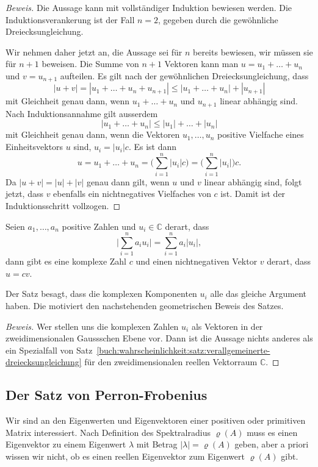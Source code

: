 \begin{proof}[Beweis]
Die Aussage kann mit vollständiger Induktion bewiesen werden.
Die Induktionsverankerung ist der Fall $n=2$, gegeben durch die
gewöhnliche Dreiecksungleichung.

Wir nehmen daher jetzt an, die Aussage sei für $n$ bereits bewiesen,
wir müssen sie für $n+1$ beweisen.
Die Summe von $n+1$ Vektoren kann man $u=u_1+\dots+u_n$ und $v=u_{n+1}$
aufteilen.
Es gilt nach der gewöhnlichen Dreiecksungleichung, dass
\[
|u+v|
=
|u_1+\dots+u_n+u_{n+1}|
\le
|u_1+\dots+u_n|+|u_{n+1}|
\]
mit Gleichheit genau dann, wenn $u_1+\dots+u_n$ und $u_{n+1}$
linear abhängig sind.
Nach Induktionsannahme gilt ausserdem
\[
|u_1+\dots+u_n| \le |u_1|+\dots+|u_n|
\]
mit Gleichheit genau dann, wenn die Vektoren $u_1,\dots,u_n$
positive Vielfache eines Einheitsvektors $u$ sind, $u_i=|u_i|c$.
Es ist dann
\[
u=u_1+\dots+u_n
=
\biggl(\sum_{i=1}^n |u_i|c\biggr)
=
\biggl(\sum_{i=1}^n |u_i|\biggr)c.
\]
Da $|u+v|=|u|+|v|$ genau dann gilt, wenn $u$ und $v$ linear abhängig sind,
folgt jetzt, dass $v$ ebenfalls ein nichtnegatives Vielfaches von $c$ ist.
Damit ist der Induktionsschritt vollzogen.
\end{proof}

\begin{satz}
\label{buch:wahrscheinlichkeit:satz:verallgdreieckC}
Seien $a_1,\dots,a_n$ positive Zahlen und $u_i\in\mathbb C$ derart,
dass 
\[
\biggl|
\sum_{i=1}^n a_i u_i
\biggr|
=
\sum_{i=1}^n a_i |u_i|,
\]
dann gibt es eine komplexe Zahl $c$ und einen nichtnegativen Vektor $v$
derart, dass $u=cv$.
\end{satz}

Der Satz besagt, dass die komplexen Komponenten $u_i$ alle das gleiche
Argument haben.
Die motiviert den nachstehenden geometrischen Beweis des Satzes.

\begin{proof}[Beweis]
Wer stellen uns die komplexen Zahlen $u_i$ als Vektoren in der
zweidimensionalen Gauss\-schen Ebene vor.
Dann ist die Aussage nichts anderes als ein Spezialfall von
Satz~\ref{buch:wahrscheinlichkeit:satz:verallgemeinerte-dreiecksungleichung}
für den zweidimensionalen reellen Vektorraum $\mathbb{C}$.
\end{proof}


%
%
\subsection{Der Satz von Perron-Frobenius
\label{buch:subsection:der-satz-von-perron-frobenius}}
Wir sind an den Eigenwerten und Eigenvektoren einer positiven
oder primitiven Matrix interessiert.
Nach Definition des Spektralradius $\varrho(A)$ muss es einen Eigenvektor 
zu einem Eigenwert $\lambda$ mit Betrag $|\lambda|=\varrho(A)$ geben,
aber a priori wissen wir nicht, ob es einen reellen Eigenvektor zum
Eigenwert $\varrho(A)$ gibt.

